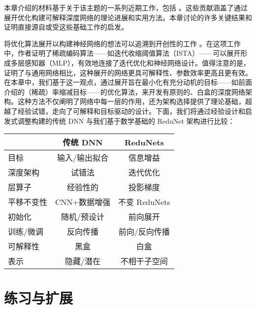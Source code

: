 \documentclass[../../book-main.tex]{subfiles}
\begin{document}
本章介绍的材料基于关于该主题的一系列近期工作，包括 \cite{chan2021redunet, wang2024global, wang2025attention, wu2025token, yu2023white}。这些贡献涵盖了通过展开优化构建可解释深度网络的理论进展和实用方法。本章讨论的许多关键结果和证明直接源自或受这些基础工作的启发。


将优化算法展开以构建神经网络的想法可以追溯到开创性的工作 \cite{gregor2010learning}。在这项工作中，作者证明了稀疏编码算法——如迭代收缩阈值算法（ISTA）——可以展开形成多层感知器（MLP），有效地连接了迭代优化和神经网络设计。值得注意的是，\cite{monga2019algorithm} 证明了与通用网络相比，这种展开的网络更具可解释性、参数效率更高且更有效。在本章中，我们基于这一观点，通过展开旨在最小化有充分动机的目标——如前面介绍的（稀疏）率缩减目标——的优化算法，来开发有原则的、白盒的深度网络架构。这种方法不仅阐明了网络中每一层的作用，还为架构选择提供了理论基础，超越了经验试错，走向了可解释和目标驱动的设计。下面，我们将通过经验设计和启发式调整构建的传统 DNN 与我们基于数学基础的 ReduNet 架构进行比较：

\begin{center}
\begin{tabular}{| l || c | c |}
\hline
  & 传统 DNN & ReduNets\\ [0.5ex]
  \hline \hline
目标 & 输入/输出拟合 & 信息增益\\ [0.5ex]
  \hline
深度架构 & 试错法 & 迭代优化 \\  [0.5ex]
\hline
层算子 & 经验性的 & 投影梯度 \\  [0.5ex]
\hline
平移不变性 & CNN+数据增强 & 不变 ReduNets \\  [0.5ex]
\hline
初始化 & 随机/预设计 & 前向展开 \\ [0.5ex]
\hline
训练/微调 & 反向传播 & 前向/反向传播\\ [0.5ex]
\hline
可解释性 & 黑盒 & 白盒 \\ [0.5ex]
\hline
表示 & 隐藏/潜在 & 不相干子空间 \\ [0.5ex]
\hline
\end{tabular}
\end{center}




\section{练习与扩展}
\end{document}
